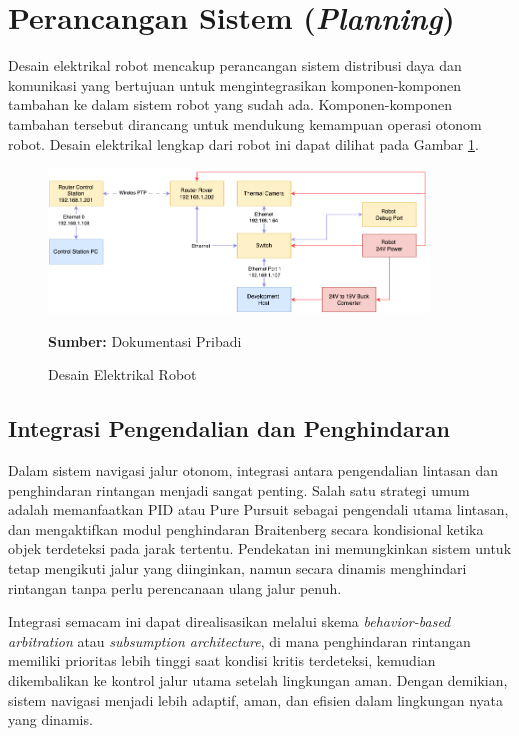\newpage



\section{Perancangan Sistem (\emph{Planning})}

Desain elektrikal robot mencakup perancangan sistem distribusi daya dan komunikasi yang bertujuan untuk mengintegrasikan komponen-komponen tambahan ke dalam sistem robot yang sudah ada. Komponen-komponen tambahan tersebut dirancang untuk mendukung kemampuan operasi otonom robot. Desain elektrikal lengkap dari robot ini dapat dilihat pada Gambar \ref{fig:electrical}.

\begin{figure}[H]
  \centering
  \includegraphics[width=0.9\textwidth]{gambar/bab3/electrical.png}
  \caption{Desain Elektrikal Robot}
  \label{fig:electrical}
  \footnotesize{\textbf{Sumber:} Dokumentasi Pribadi}
\end{figure}

\subsection{Integrasi Pengendalian dan Penghindaran}

Dalam sistem navigasi jalur otonom, integrasi antara pengendalian lintasan dan penghindaran rintangan menjadi sangat penting. Salah satu strategi umum adalah memanfaatkan PID atau Pure Pursuit sebagai pengendali utama lintasan, dan mengaktifkan modul penghindaran Braitenberg secara kondisional ketika objek terdeteksi pada jarak tertentu. Pendekatan ini memungkinkan sistem untuk tetap mengikuti jalur yang diinginkan, namun secara dinamis menghindari rintangan tanpa perlu perencanaan ulang jalur penuh.

Integrasi semacam ini dapat direalisasikan melalui skema \emph{behavior-based arbitration} atau \emph{subsumption architecture}, di mana penghindaran rintangan memiliki prioritas lebih tinggi saat kondisi kritis terdeteksi, kemudian dikembalikan ke kontrol jalur utama setelah lingkungan aman. Dengan demikian, sistem navigasi menjadi lebih adaptif, aman, dan efisien dalam lingkungan nyata yang dinamis.